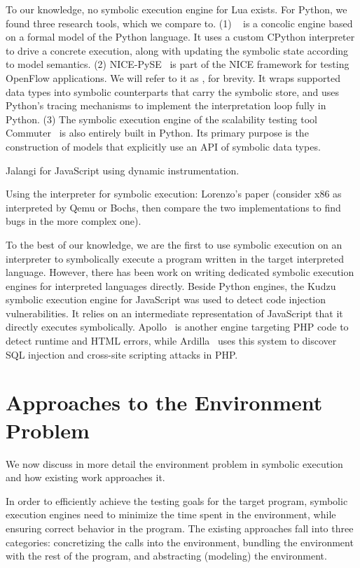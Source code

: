 To our knowledge, no symbolic execution engine for Lua exists.  For Python, we found three research tools, which we compare \chef to.  (1) \cutiepy~\cite{cutie-py} is a concolic engine based on a formal model of the Python language.  It uses a custom CPython interpreter to drive a concrete execution, along with updating the symbolic state according to model semantics. (2) NICE-PySE~\cite{nice} is part of the NICE framework for testing OpenFlow applications.  We will refer to it as \nicese, for brevity. It wraps supported data types into symbolic counterparts that carry the symbolic store, and uses Python's tracing mechanisms to implement the interpretation loop fully in Python.  (3) The symbolic execution engine of the scalability testing tool Commuter~\cite{commuter} is also entirely built in Python.  Its primary purpose is the construction of models that explicitly use an API of symbolic data types.

Jalangi for JavaScript using dynamic instrumentation.

Using the interpreter for symbolic execution: Lorenzo's paper (consider x86 as interpreted by Qemu or Bochs, then compare the two implementations to find bugs in the more complex one).

To the best of our knowledge, we are the first to use symbolic execution on an interpreter to symbolically execute a program written in the target interpreted language.  However, there has been work on writing dedicated symbolic execution engines for interpreted languages directly.  Beside Python engines, the Kudzu~\cite{saxena-kudzu} symbolic execution engine for JavaScript was used to detect code injection vulnerabilities. It relies on an intermediate representation of JavaScript that it directly executes symbolically.
%
Apollo~\cite{artzi-apollo} is another engine targeting PHP code to detect runtime and HTML errors, while Ardilla~\cite{kiezun-ardilla} uses this system to discover SQL injection and cross-site scripting attacks in PHP.



\section{Approaches to the Environment Problem}

We now discuss in more detail the environment problem in symbolic execution and how existing work approaches it.

In order to efficiently achieve the testing goals for the target program, symbolic execution engines need to minimize the time spent in the environment, while ensuring correct behavior in the program.
%
The existing approaches fall into three categories: concretizing the calls into the environment, bundling the environment with the rest of the program, and abstracting (modeling) the environment.


